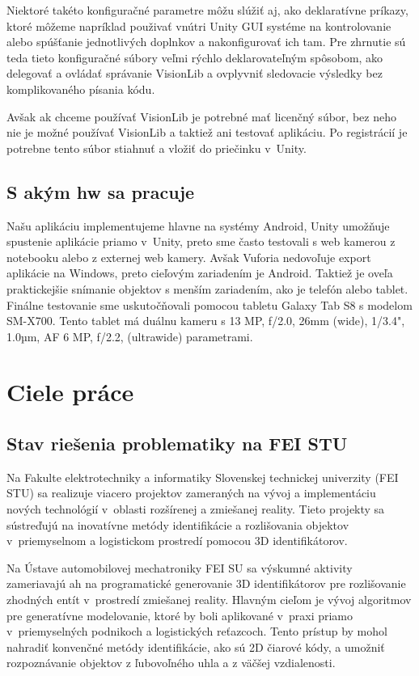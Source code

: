 Niektoré takéto konfiguračné parametre môžu slúžiť aj, ako deklaratívne príkazy, ktoré môžeme napríklad použivať vnútri Unity GUI systéme na kontrolovanie alebo spúšťanie jednotlivých doplnkov a nakonfigurovať ich tam. Pre zhrnutie sú teda tieto konfiguračné súbory veľmi rýchlo deklarovateľným spôsobom, ako delegovať a ovládať správanie VisionLib a ovplyvniť sledovacie výsledky bez komplikovaného písania kódu. 

Avšak ak chceme používať VisionLib je potrebné mať licenčný súbor, bez neho nie je možné používať VisionLib a taktiež ani testovať aplikáciu. Po registrácií je potrebne tento súbor stiahnuť a vložiť do priečinku v~Unity. \cite{visionlib2023docs}

\subsection{S akým \gls{hw} sa pracuje}

Našu aplikáciu implementujeme hlavne na systémy Android, Unity umožňuje spustenie aplikácie priamo v~Unity, preto sme často testovali s web kamerou z notebooku alebo z externej web kamery. Avšak Vuforia nedovoľuje export aplikácie na Windows, preto cieľovým zariadením je Android. Taktiež je oveľa praktickejšie snímanie objektov s menším zariadením, ako je telefón alebo tablet. Finálne testovanie sme uskutočňovali pomocou tabletu Galaxy Tab S8 s modelom SM-X700. Tento tablet má duálnu kameru s 13 MP, f/2.0, 26mm (wide), 1/3.4", 1.0µm, AF
6 MP, f/2.2, (ultrawide) parametrami.

\section{Ciele práce}

\subsection{Stav riešenia problematiky na FEI STU}

Na Fakulte elektrotechniky a informatiky Slovenskej technickej univerzity (FEI STU) sa realizuje viacero projektov zameraných na vývoj a implementáciu nových technológií v~oblasti rozšírenej a zmiešanej reality. Tieto projekty sa sústreďujú na inovatívne metódy identifikácie a rozlišovania objektov v~priemyselnom a logistickom prostredí pomocou 3D identifikátorov.

Na Ústave automobilovej mechatroniky FEI SU sa výskumné aktivity zameriavajú ah na programatické generovanie 3D identifikátorov pre rozlišovanie zhodných entít v~prostredí zmiešanej reality. Hlavným cieľom je vývoj algoritmov pre generatívne modelovanie, ktoré by boli aplikované v~praxi priamo v~priemyselných podnikoch a logistických reťazcoch. Tento prístup by mohol nahradiť konvenčné metódy identifikácie, ako sú 2D čiarové kódy, a umožniť rozpoznávanie objektov z ľubovoľného uhla a z väčšej vzdialenosti.

